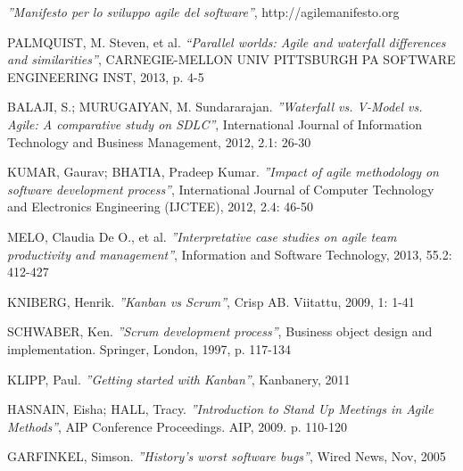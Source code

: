 \documentclass[a4paper, 12pt]{report}
\numberwithin{equation}{section}
\begin{document}
\listoffigures


\begin{thebibliography}{9}
            \emph{''Manifesto per lo sviluppo agile del software''},
        http://agilemanifesto.org
        
        PALMQUIST, M. Steven, et al.
            \emph{``Parallel worlds: Agile and waterfall differences and similarities''},
          CARNEGIE-MELLON UNIV PITTSBURGH PA SOFTWARE ENGINEERING INST, 2013, p. 4-5
          
          BALAJI, S.; MURUGAIYAN, M. Sundararajan.
            \emph{''Waterfall vs. V-Model vs. Agile: A comparative study on SDLC''},
            International Journal of Information Technology and Business Management, 2012, 2.1: 26-30
            
        KUMAR, Gaurav; BHATIA, Pradeep Kumar.
            \emph{''Impact of agile methodology on software development process''},
            International Journal of Computer Technology and Electronics Engineering (IJCTEE), 2012, 2.4: 46-50
            
        MELO, Claudia De O., et al.
            \emph{''Interpretative case studies on agile team productivity and management''},
            Information and Software Technology, 2013, 55.2: 412-427
            
        KNIBERG, Henrik.
            \emph{''Kanban vs Scrum''},
            Crisp AB. Viitattu, 2009, 1: 1-41
            
        SCHWABER, Ken.
            \emph{''Scrum development process''},
            Business object design and implementation. Springer, London, 1997, p. 117-134
            
        KLIPP, Paul.
            \emph{''Getting started with Kanban''},
            Kanbanery, 2011
            
        HASNAIN, Eisha; HALL, Tracy.
            \emph{''Introduction to Stand Up Meetings in Agile Methods''},
            AIP Conference Proceedings. AIP, 2009. p. 110-120
            
        GARFINKEL, Simson.
            \emph{''History’s worst software bugs''},
            Wired News, Nov, 2005
            

\end{thebibliography}
\end{document}
